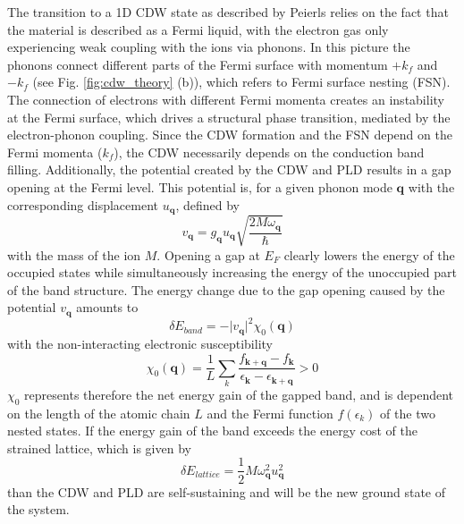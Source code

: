 The transition to a 1D CDW state as described by Peierls relies on the fact that the material is described as a Fermi liquid, with the electron gas only experiencing weak coupling with the ions via phonons.
In this picture the phonons connect different parts of the Fermi surface with momentum $+k_f$ and $-k_f$ (see Fig. \ref{fig:cdw_theory} (b)), which refers to Fermi surface nesting (FSN).
The connection of electrons with different Fermi momenta creates an instability at the Fermi surface, which drives a structural phase transition, mediated by the electron-phonon coupling.
Since the CDW formation and the FSN depend on the Fermi momenta ($k_f$), the CDW necessarily depends on the conduction band filling.
Additionally, the potential created by the CDW and PLD results in a gap opening at the Fermi level.
This potential is, for a given phonon mode $\mathbf{q}$ with the corresponding displacement $u_\mathbf{q}$, defined by
\begin{equation}
	v_\mathbf{q} = g_\mathbf{q} u_\mathbf{q} \sqrt{\frac{2M\omega_\mathbf{q}}{\hbar}}
\end{equation}
with the mass of the ion $M$.
Opening a gap at $E_F$ clearly lowers the energy of the occupied states while simultaneously increasing the energy of the unoccupied part of the band structure.
The energy change due to the gap opening caused by the potential $v_\mathbf{q}$ amounts to
\begin{equation}
	\delta E_{band} = -\lvert v_\mathbf{q}\rvert^2 \chi_0(\mathbf{q})
\end{equation}
with the non-interacting electronic susceptibility
\begin{equation}
	\chi_0(\mathbf{q}) = \frac{1}{L} \sum_{k}^{} \frac{f_{\mathbf{k}+\mathbf{q}}-f_\mathbf{k}}{\epsilon_\mathbf{k}-\epsilon_{\mathbf{k}+\mathbf{q}}}>0
	\label{eq:susz}
\end{equation}
$\chi_0$ represents therefore the net energy gain of the gapped band, and is dependent on the length of the atomic chain $L$ and the Fermi function $f(\epsilon_k)$ of the two nested states.
If the energy gain of the band exceeds the energy cost of the  strained lattice, which is given by
\begin{equation}
	\delta E_{lattice} = \frac{1}{2} M\omega_\mathbf{q}^2 u_\mathbf{q}^2
\end{equation}
than the CDW and PLD are self-sustaining and will be the new ground state of the system.

